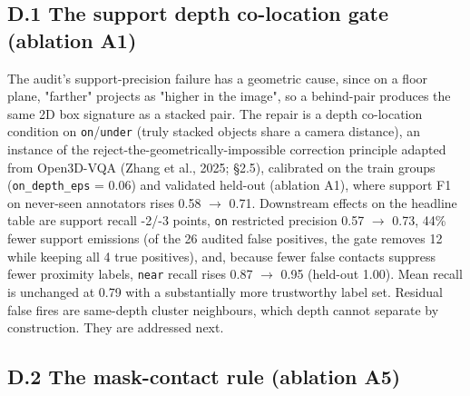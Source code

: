 \subsection{D.1 The support depth co-location gate (ablation A1)}

The audit's support-precision failure has a geometric cause, since on a floor plane, "farther" projects as "higher in the image", so a behind-pair produces the same 2D box signature as a stacked pair. The repair is a depth co-location condition on \texttt{on}/\texttt{under} (truly stacked objects share a camera distance), an instance of the reject-the-geometrically-impossible correction principle adapted from Open3D-VQA (Zhang et al., 2025; \S{}2.5), calibrated on the train groups (\texttt{on\_\allowbreak{}depth\_\allowbreak{}eps} = 0.06) and validated held-out (ablation A1), where support F1 on never-seen annotators rises 0.58 $\rightarrow$ 0.71. Downstream effects on the headline table are support recall -2/-3 points, \texttt{on} restricted precision 0.57 $\rightarrow$ 0.73, 44\% fewer support emissions (of the 26 audited false positives, the gate removes 12 while keeping all 4 true positives), and, because fewer false contacts suppress fewer proximity labels, \texttt{near} recall rises 0.87 $\rightarrow$ 0.95 (held-out 1.00). Mean recall is unchanged at 0.79 with a substantially more trustworthy label set. Residual false fires are same-depth cluster neighbours, which depth cannot separate by construction. They are addressed next.

\subsection{D.2 The mask-contact rule (ablation A5)}

